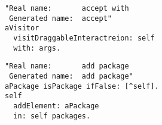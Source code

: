 \begin{lstlisting}
"Real name:       accept with
 Generated name:  accept"
aVisitor
  visitDraggableInteractreion: self
  with: args.
\end{lstlisting}

\begin{lstlisting}
"Real name:       add package
 Generated name:  add package"
aPackage isPackage ifFalse: [^self].
self
  addElement: aPackage
  in: self packages.
\end{lstlisting}
%
